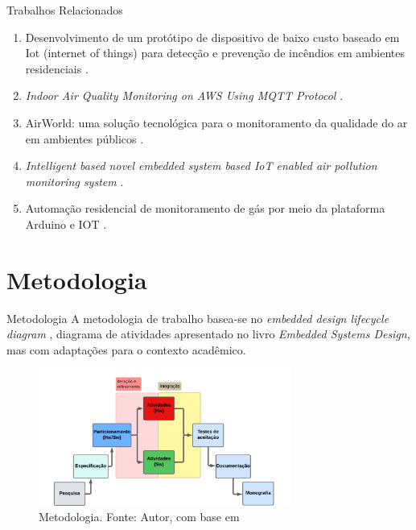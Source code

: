 \documentclass[12pt]{beamer}
\begin{document}
    \begin{frame}{Trabalhos Relacionados}
        \begin{enumerate}
            \item Desenvolvimento de um protótipo de dispositivo de baixo custo baseado em Iot (internet of things) para detecção e prevenção de incêndios em ambientes residenciais \cite{uea-iot-deteccao-incendio}.
            \item \textit{Indoor Air Quality Monitoring on AWS Using MQTT Protocol} \cite{iot-monitoring-on-aws}.
            \item AirWorld: uma solução tecnológica para o monitoramento da qualidade do ar em ambientes públicos \cite{UFAMAirWorld}.
            \item \textit{Intelligent based novel embedded system based IoT enabled
            air pollution monitoring system} \cite{tbRelacionado4NovelEmbeddedSystem}.
            \item Automação residencial de monitoramento de gás por meio da plataforma Arduino e IOT \cite{alexandre-automaccao-formulas-de-leitura-sensor}.
        \end{enumerate}
    \end{frame}

    \section{Metodologia}

    \begin{frame}{Metodologia}
        A metodologia de trabalho basea-se no \textit{embedded design lifecycle diagram} \cite{system-design-IOT}, diagrama de atividades 
        apresentado no livro \textit{Embedded Systems Design}, mas com adaptações para o contexto acadêmico.

        \begin{figure}[ht]
            \centering
            \includegraphics[width=0.74\textwidth]{img/diagrama-metodologia.png}
            \caption{Metodologia. Fonte: Autor, com base em \cite{system-design-IOT}}\label{fig:metodologia}
        \end{figure}
    \end{frame}
\end{document}
